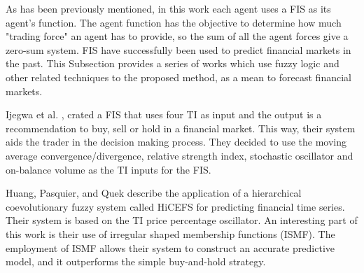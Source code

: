\documentclass[a4paper,twoside]{article}
\begin{document}

As has been previously mentioned, in this work each agent uses a FIS
as its agent's function. The agent function has the objective to
determine how much "trading force" an agent has to provide, so the sum
of all the agent forces give a zero-sum system. FIS have successfully
been used to predict financial markets in the past. This Subsection
provides a series of works which use fuzzy logic and other related
techniques to the proposed method, as a mean to forecast financial
markets. 

Ijegwa et al. \cite{Ijegwa2014}, crated a FIS that uses four TI as
input and the output is a recommendation to buy, sell or hold in a
financial market. This way, their system aids the trader in the
decision making process. They decided to use the moving average
convergence/divergence, relative strength index, stochastic oscillator
and on-balance volume as the TI inputs for the FIS. 

Huang, Pasquier, and Quek \cite{Huang2009} describe the application of
a hierarchical coevolutionary fuzzy system called HiCEFS for
predicting financial time series. Their system is based on the TI
price percentage oscillator. An interesting part of this work is their
use of irregular shaped membership functions (ISMF). The employment of
ISMF allows their system to construct an accurate predictive model,
and it outperforms the simple buy-and-hold strategy. 



\end{document}
